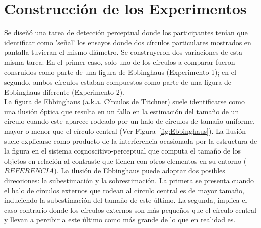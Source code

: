 \section{Construcción de los Experimentos}

Se diseñó una tarea de detección perceptual donde los participantes tenían que identificar como 'señal' los ensayos donde dos círculos particulares mostrados en pantalla tuvieran el mismo diámetro. Se construyeron dos variaciones de esta misma tarea: En el primer caso, solo uno de los círculos a comparar fueron consruidos como parte de una figura de Ebbinghaus (Experimento 1); en el segundo, ambos círculos estaban compuestos como parte de una figura de Ebbinghaus diferente (Experimento 2).\\ 

La figura de Ebbinghaus (a.k.a. Círculos de Titchner) suele identificarse como una ilusión óptica que resulta en un fallo en la estimación del tamaño de un círculo cuando este aparece rodeado por un halo de círculos de tamaño uniforme, mayor o menor que el círculo central (Ver Figura~\ref{fig:Ebbinghaus}). La ilusión suele explicarse como producto de la interferencia ocasionada por la estructura de la figura en el sistema cognoscitivo-perceptual que computa el tamaño de los objetos en relación al contraste que tienen con otros elementos en su entorno ($REFERENCIA$). La ilusión de Ebbinghaus puede adoptar dos posibles direcciones: la subestimación y la sobrestimación. La primera se presenta cuando el halo de círculos externos que rodean al círculo central es de mayor tamaño, induciendo la subestimación del tamaño de este último. La segunda, implica el caso contrario donde los círculos externos son más pequeños que el círculo central y llevan a percibir a este último como más grande de lo que en realidad es.\\


